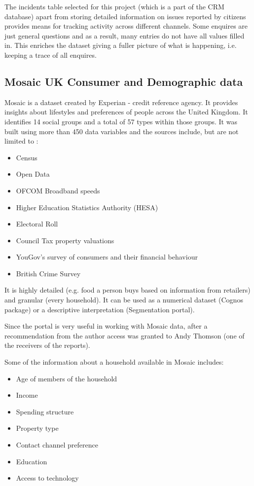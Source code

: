 The incidents table selected for this project (which is a part of the CRM database) apart from storing detailed information on issues reported by citizens provides means for tracking activity across different channels. Some enquires are just general questions and as a result, many entries do not have all values filled in. This enriches the dataset giving a fuller picture of what is happening, i.e. keeping a trace of all enquires.		
		
		\subsection{Mosaic UK Consumer and Demographic data}
		
Mosaic is a dataset created by Experian - credit reference agency. It provides insights about lifestyles and preferences of people across the United Kingdom. It identifies 14 social groups and a total of 57 types within those groups. It was built using more than 450 data variables and the sources include, but are not limited to \citep{Experian2014}:	

\begin{itemize}
\item Census
\item Open Data
\item OFCOM Broadband speeds
\item Higher Education Statistics Authority (HESA)
\item Electoral Roll
\item Council Tax property valuations
\item YouGov’s survey of consumers and their financial behaviour
\item British Crime Survey
\end{itemize}

It is highly detailed (e.g. food a person buys based on information from retailers) and granular (every household). It can be used as a numerical dataset (Cognos package) or a descriptive interpretation (Segmentation portal).

Since the portal is very useful in working with Mosaic data, after a recommendation from the author access was granted to Andy Thomson (one of the receivers of the reports).

Some of the information about a household available in Mosaic includes:

\begin{itemize}
\item Age of members of the household
\item Income
\item Spending structure
\item Property type
\item Contact channel preference
\item Education
\item Access to technology
\end{itemize}
	
